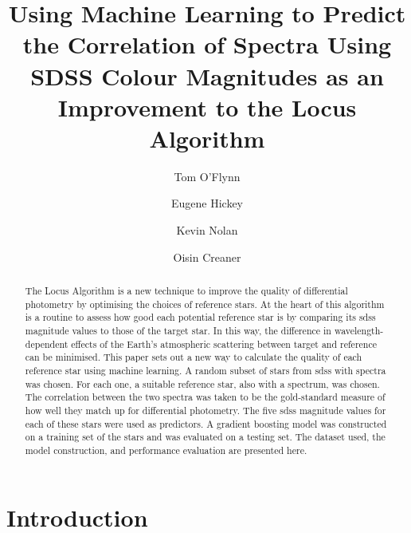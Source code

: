 \documentclass[]{elsarticle} %
\begin{document}
\begin{frontmatter}

  \title{Using Machine Learning to Predict the Correlation of Spectra
Using SDSS Colour Magnitudes as an Improvement to the Locus Algorithm}
    \author[Technological University Dublin]{Tom O'Flynn}
    \author[Technological University Dublin]{Eugene Hickey}
    \author[Technological University Dublin]{Kevin Nolan}
    \author[Dublin Institute of Advanced Studies]{Oisin
Creaner}
      \address[Technological University Dublin]{Department of Applied
Science, Dublin D24FKT9}
    \address[Dublin Institute of Advanced Studies]{Department, Street,
City, State, Zip}
  
  \begin{abstract}
  The Locus Algorithm is a new technique to improve the quality of
  differential photometry by optimising the choices of reference stars.
  At the heart of this algorithm is a routine to assess how good each
  potential reference star is by comparing its sdss magnitude values to
  those of the target star. In this way, the difference in
  wavelength-dependent effects of the Earth's atmospheric scattering
  between target and reference can be minimised. This paper sets out a
  new way to calculate the quality of each reference star using machine
  learning. A random subset of stars from sdss with spectra was chosen.
  For each one, a suitable reference star, also with a spectrum, was
  chosen. The correlation between the two spectra was taken to be the
  gold-standard measure of how well they match up for differential
  photometry. The five sdss magnitude values for each of these stars
  were used as predictors. A gradient boosting model was constructed on
  a training set of the stars and was evaluated on a testing set. The
  dataset used, the model construction, and performance evaluation are
  presented here.
  \end{abstract}
  
 \end{frontmatter}

\hypertarget{introduction}{%
\section{Introduction}\label{introduction}}
\end{document}
